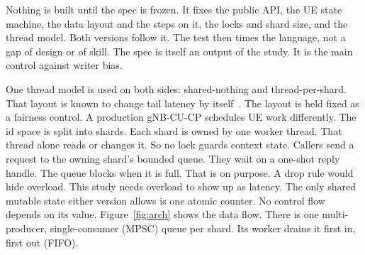 \documentclass[english,oneside,a4paper,censored,csm,software-track-2020]{HYthesisML}
\begin{document}
Nothing is built until the spec is frozen. It fixes the public API, the UE
state machine, the data layout and the steps on it, the locks and shard size,
and the thread model. Both versions follow it. The test then times the
language, not a gap of design or of skill. The spec is itself an output of the
study. It is the main control against writer bias.

One thread model is used on both sides: shared-nothing and thread-per-shard.
That layout is known to change tail latency by
itself~\cite{enberg2019threadpercore}. The layout is held fixed as a fairness
control. A production gNB-CU-CP schedules UE work differently. The id space is split into shards. Each
shard is owned by one worker thread. That thread alone reads or changes it.
So no lock guards context state. Callers send a request to the owning shard's
bounded queue. They wait on a one-shot reply handle. The queue blocks when it
is full. That is on purpose. A drop rule would hide overload. This study needs
overload to show up as latency. The only shared mutable state either version
allows is one atomic counter. No control flow depends on its value.
Figure~\ref{fig:arch} shows the data flow. There is one multi-producer,
single-consumer (MPSC) queue per shard. Its worker drains it first in, first
out (FIFO).
\end{document}

